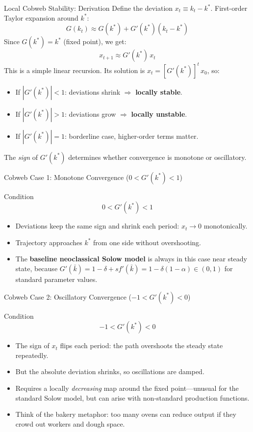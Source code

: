 \documentclass[aspectratio=169,10pt]{beamer}
\newcommand{\apxbutton}[1]{\hfill\hyperlink{#1}{\beamerbutton{Appendix}}}
\begin{document}
\begin{frame}{Local Cobweb Stability: Derivation}
\hypertarget{m-a17}{}
Define the deviation $x_t\equiv k_t-k^*$. First-order Taylor expansion around $k^*$:
\[
G(k_t)\approx G(k^*)+G'(k^*)(k_t-k^*)
\]
Since $G(k^*)=k^*$ (fixed point), we get:
\[
x_{t+1}\approx G'(k^*)\,x_t
\]
This is a simple linear recursion. Its solution is $x_t = [G'(k^*)]^t \, x_0$, so:
\begin{itemize}
  \item If $|G'(k^*)|<1$: deviations shrink $\Rightarrow$ \textbf{locally stable}.
  \item If $|G'(k^*)|>1$: deviations grow $\Rightarrow$ \textbf{locally unstable}.
  \item If $|G'(k^*)|=1$: borderline case, higher-order terms matter.
\end{itemize}
The \emph{sign} of $G'(k^*)$ determines whether convergence is monotone or oscillatory.
\apxbutton{a17}
\end{frame}

\begin{frame}{Cobweb Case 1: Monotone Convergence ($0<G'(k^*)<1$)}
\begin{block}{Condition}
\[
0<G'(k^*)<1
\]
\end{block}
\begin{itemize}
  \item Deviations keep the same sign and shrink each period: $x_t \to 0$ monotonically.
  \item Trajectory approaches $k^*$ from one side without overshooting.
  \item The \textbf{baseline neoclassical Solow model} is always in this case near steady state, because $G'(\bar{k}) = 1-\delta+sf'(\bar{k}) = 1 - \delta(1-\alpha) \in (0,1)$ for standard parameter values.
\end{itemize}
\end{frame}

\begin{frame}{Cobweb Case 2: Oscillatory Convergence ($-1<G'(k^*)<0$)}
\begin{block}{Condition}
\[
-1<G'(k^*)<0
\]
\end{block}
\begin{itemize}
  \item The sign of $x_t$ flips each period: the path overshoots the steady state repeatedly.
  \item But the absolute deviation shrinks, so oscillations are damped.
  \item Requires a locally \emph{decreasing} map around the fixed point---unusual for the standard Solow model, but can arise with non-standard production functions.
  \item Think of the bakery metaphor: too many ovens can reduce output if they crowd out workers and dough space.
\end{itemize}
\end{frame}
\end{document}
